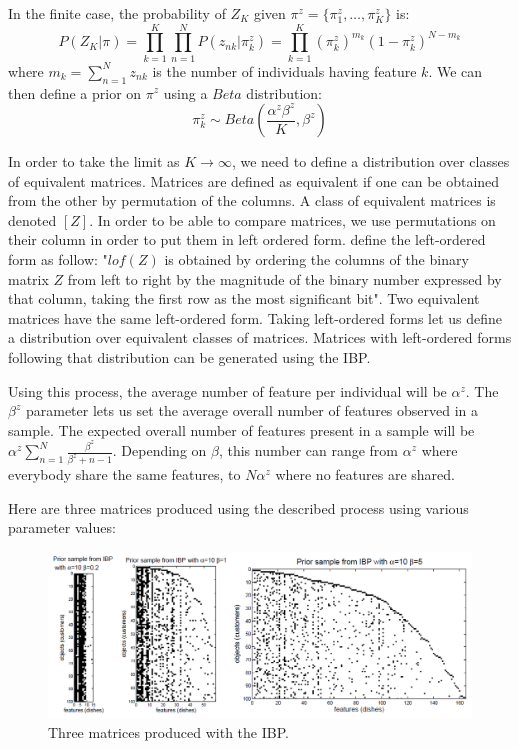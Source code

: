 \documentclass[12pt]{article}
\begin{document}
In the finite case, the probability of $Z_K$ given $\pi^z=\{\pi_1^z,\ldots,\pi_K^z\}$ is:
$$ P(Z_K|\pi) = \prod_{k=1}^{K} \prod_{n=1}^{N} P(z_{nk}|\pi_k^z)  = \prod_{k=1}^{K} (\pi_k^z)^{m_k} (1-\pi_k^z)^{N-m_k}$$ 
where $m_k=\sum_{n=1}^{N} z_{nk}$ is the number of individuals having feature $k$.
We can then define a prior on $\pi^z$ using a $Beta$ distribution:
$$\pi_k^z \sim Beta(\frac{\alpha^z \beta^z}{K},\beta^z)$$

In order to take the limit as $K \to \infty$, we need to define a distribution over classes of equivalent matrices. Matrices are defined as equivalent if one can be obtained from the other by permutation of the columns. A class of equivalent matrices is denoted $[Z]$. In order to be able to compare matrices, we use permutations on their column in order to put them in left ordered form. \cite{griffiths2011indian} define the left-ordered form as follow: "$lof(Z)$ is obtained by ordering
the columns of the binary matrix $Z$ from left to right by the magnitude of the binary number
expressed by that column, taking the first row as the most significant bit". Two equivalent matrices have the same left-ordered form. Taking left-ordered forms let us define a distribution over equivalent classes of matrices. Matrices with left-ordered forms following that distribution can be generated using the IBP.

Using this process, the average number of feature per individual will be $\alpha^z$. The $\beta^z$ parameter lets us set the average overall number of features observed in a sample. The expected overall number of features present in a sample will be $\alpha^z \sum_{n=1}^{N} \frac{\beta^z}{\beta^z + n - 1}$. Depending on $\beta$, this number can range from $\alpha^z$ where everybody share the same features, to $N\alpha^z$ where no features are shared.

Here are three matrices produced using the described process using various parameter values:
\begin{figure}[!ht]
	\centering
	\includegraphics[scale=0.5]{img/IBP2params.png}
	\caption{Three matrices produced with the IBP.\citep{griffiths2011indian}}
\end{figure}
\end{document}
